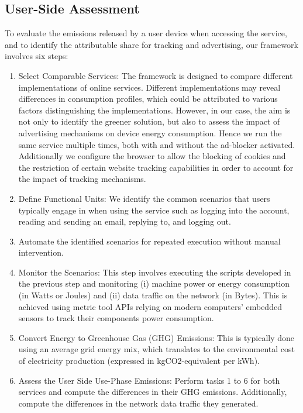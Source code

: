 \documentclass[sigconf,9pt,usenames,dvipsnames,table]{acmart}
\begin{document}
\subsection{User-Side Assessment}

To evaluate the emissions released by a user device when accessing
the service, and to identify the attributable share for tracking and
advertising, our framework involves six steps:

\begin{enumerate}
  \item Select Comparable Services: The framework is designed to compare
        different implementations of online services. Different implementations may
        reveal differences in consumption profiles, which could be attributed to
        various factors distinguishing the implementations. However, in our case,
        the aim is not only to identify the greener solution, but also to assess the impact
        of advertising mechanisms on device energy consumption. Hence we run the same
        service multiple times, both with and without the ad-blocker activated.
        Additionally we configure the browser to allow the blocking of cookies
        and the restriction of certain website tracking capabilities in order to
        account for the impact of tracking mechanisms.
  \item Define Functional Units: We identify the common scenarios that
        users typically engage in when using the service such as logging into the
        account, reading and sending an email, replying to, and logging out.
  \item Automate the identified scenarios for repeated execution without
        manual intervention.
  \item Monitor the Scenarios: This step involves executing the scripts
        developed in the previous step and monitoring (i) machine power or energy
        consumption (in Watts or Joules) and (ii) data traffic on the network (in
        Bytes). %
        This is achieved using metric
        tool APIs relying on modern computers' embedded sensors to track their components power consumption.
  \item Convert Energy to Greenhouse Gas (GHG) Emissions: This is typically done using an
        average grid energy mix, which translates to the environmental cost of
        electricity production (expressed in kgCO2-equivalent per kWh).
  \item Assess the User Side Use-Phase Emissions: Perform tasks 1 to 6 for both services and compute the differences in their GHG emissions.
        Additionally, compute the differences in the network data traffic they
        generated.
\end{enumerate}
\end{document}

